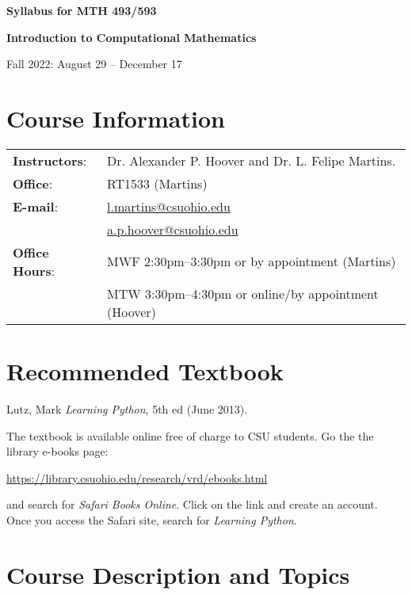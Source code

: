\documentclass[12pt]{article}
\begin{document}
\sffamily

\begin{center}


\bigskip
{\large \textbf{Syllabus for MTH 493/593}

\textbf{Introduction to Computational Mathematics}}

Fall 2022: August 29 -- December 17
\end{center}

\section{Course Information}
\begin{tabular}{ll}
\textbf{Instructors}: & Dr. Alexander P. Hoover and Dr. L. Felipe Martins.\\
\textbf{Office}: &  RT1533 (Martins)\\
\textbf{E-mail}: &  \href{mailto:l.martins@csuohio.edu}{l.martins@csuohio.edu}\\
                 &  \href{mailto:a.p.hoover@csuohio.edu}{a.p.hoover@csuohio.edu}\\
\textbf{Office Hours}: & MWF 2:30pm--3:30pm or by appointment (Martins)\\
                       & MTW 3:30pm--4:30pm or online/by appointment (Hoover) \\
\end{tabular}


\section{Recommended Textbook}

Lutz, Mark \emph{Learning Python}, 5th ed (June 2013).

The textbook is available online free of charge to CSU students. Go the the library e-books page:
\begin{center}
\url{https://library.csuohio.edu/research/vrd/ebooks.html}
\end{center}
and search for \emph{Safari Books Online}. Click on the link and create an account. Once you access the Safari site, search for \emph{Learning Python}.


\section{Course Description and Topics}
\end{document}
